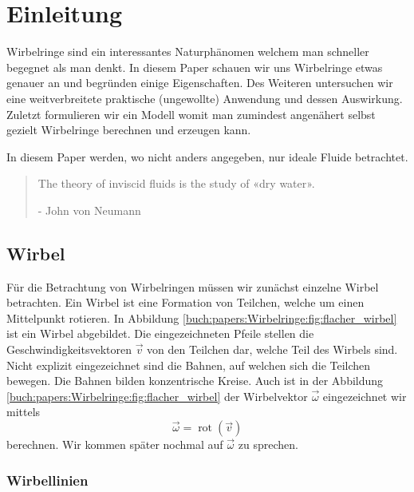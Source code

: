 %
%
%
\section{Einleitung}

Wirbelringe sind ein interessantes Naturphänomen welchem man schneller begegnet als man denkt. 
In diesem Paper schauen wir uns Wirbelringe etwas genauer an und begründen einige Eigenschaften. 
Des Weiteren untersuchen wir eine weitverbreitete praktische (ungewollte) Anwendung und dessen Auswirkung. 
Zuletzt formulieren wir ein Modell womit man zumindest angenähert selbst gezielt Wirbelringe berechnen und erzeugen kann.

In diesem Paper werden, wo nicht anders angegeben, nur ideale Fluide betrachtet.

\begin{quote}
    The theory of inviscid fluids is the study of «dry water».

    - John von Neumann \cite{Wirbelringe:feynman1964lectures}
\end{quote}

\subsection{Wirbel}



Für die Betrachtung von Wirbelringen müssen wir zunächst einzelne Wirbel betrachten.
Ein Wirbel ist eine Formation von Teilchen, welche um einen Mittelpunkt rotieren.
In Abbildung \ref{buch:papers:Wirbelringe:fig:flacher_wirbel} ist ein Wirbel abgebildet.
Die eingezeichneten Pfeile stellen die Geschwindigkeitsvektoren \( \vec{v} \) von den Teilchen dar, welche Teil des Wirbels sind.
Nicht explizit eingezeichnet sind die Bahnen, auf welchen sich die Teilchen bewegen.
Die Bahnen bilden konzentrische Kreise.
Auch ist in der Abbildung \ref{buch:papers:Wirbelringe:fig:flacher_wirbel} der Wirbelvektor \(\vec{\omega}\) eingezeichnet wir mittels
\[
\vec{\omega}
=
\operatorname{rot}(\vec{v})
\]
berechnen.
Wir kommen später nochmal auf \(\vec{\omega}\) zu sprechen.

\subsubsection*{Wirbellinien \label{paper:Wirbelringe:Wirbellinien}}

